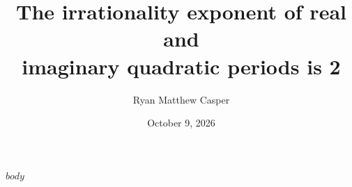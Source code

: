 \documentclass[11pt]{article}
\title{The irrationality exponent of real and\\imaginary quadratic periods is 2}
\author{Ryan Matthew Casper}
\date{October 9, 2026}
\begin{document}
\maketitle
$body$
\end{document}
